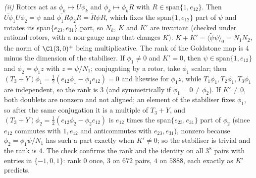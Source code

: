 \emph{(ii)} Rotors act as $\phi_{k} \mapsto U\phi_{k}$ and $\phi_{k} \mapsto \phi_{k}R$ with $R \in \mathrm{span}\{1, e_{12}\}$. Then $\widetilde{U\phi_{1}}U\phi_{2} = \psi$ and $\widetilde{\phi_{1}R}\phi_{2}R = \widetilde{R}\psi R$, which fixes the span$\{1, e_{12}\}$ part of $\psi$ and rotates its span$\{e_{23}, e_{31}\}$ part, so $N_{k}$, $K$ and $K'$ are invariant (checked under rational rotors, with a non-gauge map that changes $K$). $K + K' = \langle\widetilde{\psi}\psi\rangle_{0} = N_{1}N_{2}$, the norm of $\Cl(3,0)^{+}$ being multiplicative. The rank of the Goldstone map is $4$ minus the dimension of the stabiliser. If $\phi_{1} \ne 0$ and $K' = 0$, then $\psi \in \mathrm{span}\{1, e_{12}\}$ and $\phi_{2} = \phi_{1}z$ with $z = \psi/N_{1}$; conjugating by a rotor, take $\phi_{1}$ scalar; then $(T_{3} + Y)\phi_{1} = \tfrac12(e_{12}\phi_{1} - \phi_{1}e_{12}) = 0$ and likewise for $\phi_{1}z$, while $T_{1}\phi_{1}, T_{2}\phi_{1}, T_{3}\phi_{1}$ are independent, so the rank is $3$ (and symmetrically if $\phi_{1} = 0 \ne \phi_{2}$). If $K' \ne 0$, both doublets are nonzero and not aligned; an element of the stabiliser fixes $\phi_{1}$, so after the same conjugation it is a multiple of $T_{3} + Y$, and $(T_{3} + Y)\phi_{2} = \tfrac12(e_{12}\phi_{2} - \phi_{2}e_{12})$ is $e_{12}$ times the span$\{e_{23}, e_{31}\}$ part of $\phi_{2}$ (since $e_{12}$ commutes with $1, e_{12}$ and anticommutes with $e_{23}, e_{31}$), nonzero because $\phi_{2} = \phi_{1}\psi/N_{1}$ has such a part exactly when $K' \ne 0$; so the stabiliser is trivial and the rank is $4$. The check confirms the rank and the identity on all $3^{8}$ pairs with entries in $\{-1, 0, 1\}$: rank $0$ once, $3$ on $672$ pairs, $4$ on $5888$, each exactly as $K'$ predicts.

